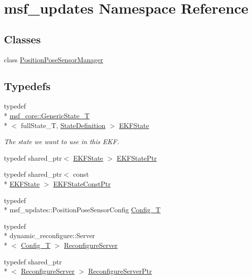 \hypertarget{namespacemsf__updates}{\section{msf\-\_\-updates Namespace Reference}
\label{namespacemsf__updates}
}
\subsection*{Classes}
\begin{DoxyCompactItemize}
\item 
class \hyperlink{classmsf__updates_1_1PositionPoseSensorManager}{Position\-Pose\-Sensor\-Manager}
\end{DoxyCompactItemize}
\subsection*{Typedefs}
\begin{DoxyCompactItemize}
\item 
typedef \\*
\hyperlink{structmsf__core_1_1GenericState__T}{msf\-\_\-core\-::\-Generic\-State\-\_\-\-T}\\*
$<$ full\-State\-\_\-\-T, \hyperlink{namespacemsf__updates_a2812be4bf8c439845faf79dd4860835a}{State\-Definition} $>$ \hyperlink{namespacemsf__updates_a03b0801c76b7400623b00ad4d28f9bcc}{E\-K\-F\-State}
\begin{DoxyCompactList}\small\item\em The state we want to use in this E\-K\-F. \end{DoxyCompactList}\item 
typedef shared\-\_\-ptr$<$ \hyperlink{namespacemsf__updates_a03b0801c76b7400623b00ad4d28f9bcc}{E\-K\-F\-State} $>$ \hyperlink{namespacemsf__updates_a8b9141b87154a173f69bfabf7300faa9}{E\-K\-F\-State\-Ptr}
\item 
typedef shared\-\_\-ptr$<$ const \\*
\hyperlink{namespacemsf__updates_a03b0801c76b7400623b00ad4d28f9bcc}{E\-K\-F\-State} $>$ \hyperlink{namespacemsf__updates_ade643a1ed63184fece1ca05ec8142b9d}{E\-K\-F\-State\-Const\-Ptr}
\item 
typedef \\*
msf\-\_\-updates\-::\-Position\-Pose\-Sensor\-Config \hyperlink{namespacemsf__updates_a4f0eca6cc27f15ff678a81cb92219824}{Config\-\_\-\-T}
\item 
typedef \\*
dynamic\-\_\-reconfigure\-::\-Server\\*
$<$ \hyperlink{namespacemsf__updates_a4f0eca6cc27f15ff678a81cb92219824}{Config\-\_\-\-T} $>$ \hyperlink{namespacemsf__updates_a84e4237e24ccbd1cd9b9211f39e40a67}{Reconfigure\-Server}
\item 
typedef shared\-\_\-ptr\\*
$<$ \hyperlink{namespacemsf__updates_a84e4237e24ccbd1cd9b9211f39e40a67}{Reconfigure\-Server} $>$ \hyperlink{namespacemsf__updates_a727af77e9a65a5389c5971fde09a7377}{Reconfigure\-Server\-Ptr}
\end{DoxyCompactItemize}
